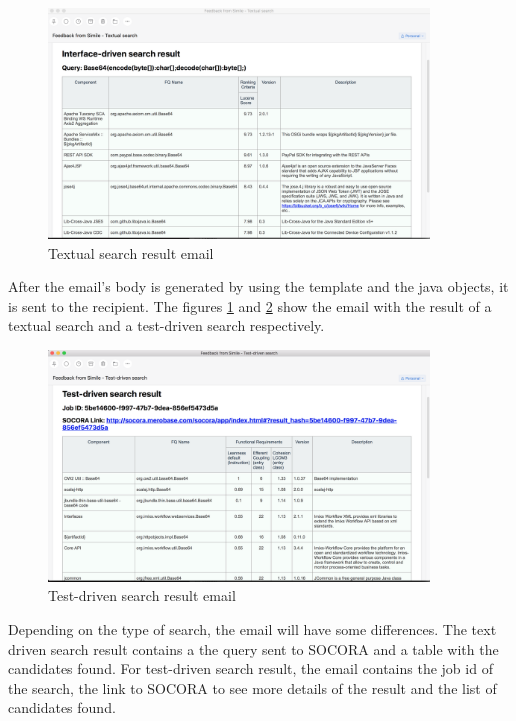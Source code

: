 \begin{figure}[H]
	\centering
    \includegraphics[width=0.9\textwidth]{grafiken/email-01}
    \caption{Textual search result email}
    \label{fig:email-01}
\end{figure}

After the email's body is generated by using the template and the java objects, it is sent to the recipient. The figures \ref{fig:email-01} and \ref{fig:email-02} show the email with the result of a textual search and a test-driven search respectively.

\begin{figure}[H]
	\centering
    \includegraphics[width=0.9\textwidth]{grafiken/email-02}
    \caption{Test-driven search result email}
    \label{fig:email-02}
\end{figure}

Depending on the type of search, the email will have some differences. The text driven search result contains a the query sent to SOCORA and a table with the candidates found. For test-driven search result, the email contains the job id of the search, the link to SOCORA to see more details of the result and the list of candidates found.

